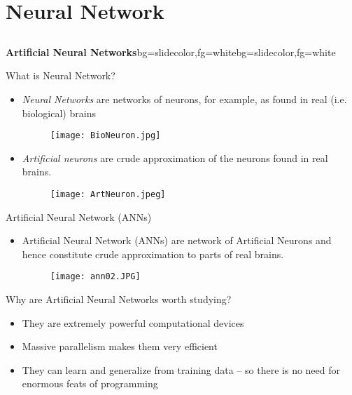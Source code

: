 \section{Neural Network}
\subsection{}

\begin{frame}{}
\begin{variableblock}{\centering \Large \textbf{\vspace{4pt}\newline Artificial Neural Networks\vspace{4pt}}}{bg=slidecolor,fg=white}{bg=slidecolor,fg=white}
\end{variableblock}
\end{frame}

\begin{frame}{What is Neural Network?}
\begin{itemize}
\item \textit{\color{slidecolor}Neural Networks} are networks of neurons, for example, as found in real (i.e. biological) brains
\begin{figure}
\texttt{[image: BioNeuron.jpg]}
\end{figure}
\item \textit{\color{slidecolor}Artificial neurons} are crude approximation of the neurons found in real brains.
\begin{figure}
\texttt{[image: ArtNeuron.jpeg]}
\end{figure}
\end{itemize}
\end{frame}

\begin{frame}{Artificial Neural Network (ANNs)}
\begin{itemize}
\item Artificial Neural Network (ANNs) are network of Artificial Neurons and hence constitute crude approximation to parts of real brains.
\begin{figure}
\texttt{[image: ann02.JPG]}
\end{figure}
\end{itemize}
\end{frame}

\begin{frame}{Why are Artificial Neural Networks worth studying?}
\begin{itemize}
\item They are extremely powerful computational devices
\item Massive parallelism makes them very efficient
\item They can learn and generalize from training data -- so there is no need for enormous feats of programming
\end{itemize}
\end{frame}

